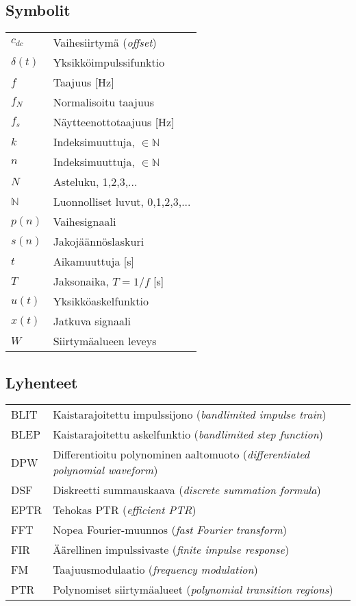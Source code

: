 \documentclass[finnish,12pt,a4paper,pdftex]{article} %
\begin{document}
\newpage

{\renewcommand{\baselinestretch}{1.05}
\thesistableofcontents}


\subsection*{Symbolit}
{\setlength{\tabcolsep}{4mm}
	\renewcommand{\arraystretch}{1.15}
\begin{tabular}{ll}
 $c_{dc}$		& Vaihesiirtymä (\textit{offset}) \\
$\delta(t)$		& Yksikköimpulssifunktio \\
$f$				& Taajuus [Hz] \\
$f_N$			& Normalisoitu taajuus \\
$f_s$			& Näytteenottotaajuus [Hz] \\
$k$				& Indeksimuuttuja, $ \in \mathbb{N}$ \\
$n$				& Indeksimuuttuja, $ \in \mathbb{N}$ \\
$N$				& Asteluku, 1,2,3,... \\
$\mathbb{N}$	& Luonnolliset luvut, 0,1,2,3,... \\
$p(n)$			& Vaihesignaali \\
$s(n)$			& Jakojäännöslaskuri \\
$t$				& Aikamuuttuja [s] \\
$T$				& Jaksonaika, $T = 1/f $ [s] \\
$u(t)$			& Yksikköaskelfunktio \\
$x(t)$			& Jatkuva signaali \\
$W$			& Siirtymäalueen leveys \\
\end{tabular}}
\vspace{3mm}
{\setlength{\tabcolsep}{4mm}
	\renewcommand{\arraystretch}{1.15}
\subsection*{Lyhenteet}
\begin{tabular}{ll}
BLIT	& Kaistarajoitettu impulssijono (\textit{bandlimited impulse train}) \\
BLEP	& Kaistarajoitettu askelfunktio (\textit{bandlimited step function}) \\
DPW		& Differentioitu polynominen aaltomuoto (\textit{differentiated polynomial waveform}) \\
DSF		& Diskreetti summauskaava (\textit{discrete summation formula}) \\
EPTR	& Tehokas PTR (\textit{efficient PTR}) \\
FFT		& Nopea Fourier-muunnos (\textit{fast Fourier transform}) \\
FIR		& Äärellinen impulssivaste (\textit{finite impulse response}) \\
FM		& Taajuusmodulaatio (\textit{frequency modulation}) \\
PTR		& Polynomiset siirtymäalueet (\textit{polynomial transition regions})  \\
\end{tabular}}
\end{document}
